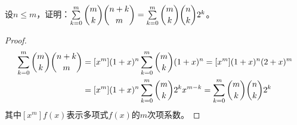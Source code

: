             \begin{example}
                设$n\leq m$，证明：$\sum\limits_{k=0}^{m}\dbinom{m}{k}\dbinom{n+k}{m}=\sum\limits_{k=0}^{m}\dbinom{m}{k}\dbinom{n}{k}2^k$。
            \end{example}

            \begin{proof}
                \begin{equation*}
                    \begin{split}
                        \sum\limits_{k=0}^{m}\dbinom{m}{k}\dbinom{n+k}{m}&=[x^m](1+x)^n\sum_{k=0}^m\binom{m}{k}(1+x)^n=[x^m](1+x)^{n}(2+x)^m \\
                                                                         &=[x^m](1+x)^n\sum_{k=0}^m\binom{m}{k}2^{k}x^{m-k}=\sum_{k=0}^{m}\dbinom{m}{k}\dbinom{n}{k}2^k
                    \end{split}
                \end{equation*}
                其中$[x^m]f(x)$表示多项式$f(x)$的$m$次项系数。
            \end{proof}
